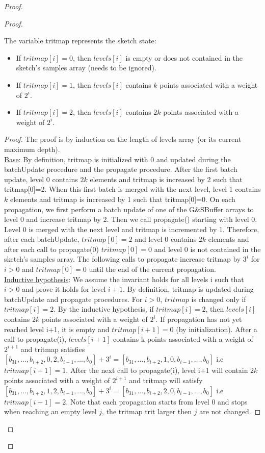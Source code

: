 \begin{proof}
\begin{proof}
\begin{invariant} \label{Inv: tritmap_sketch_state}
The variable tritmap represents the sketch state:
\begin{itemize}
    \item If \(tritmap[i] = 0\), then \(levels[i]\) is empty or does not contained in the sketch's samples array (needs to be ignored).
    \item If \(tritmap[i] = 1\), then \(levels[i]\) contains \(k\) points associated with a weight of \(2^i\).
    \item If \(tritmap[i] = 2\), then \(levels[i]\) contains \(2k\) points associated with a weight of \(2^i\).
\end{itemize}
\end{invariant}
\begin{proof}
The proof is by induction on the length of levels array (or its current maximum depth).\\
\underline{Base}: By definition, tritmap is initialized with 0 and updated during the batchUpdate procedure and the propagate procedure.
After the first batch update, level 0 contains $2k$ elements and tritmap is increased by 2 such that tritmap[0]=2. When this first batch is merged with the next level, level 1 contains $k$ elements and tritmap is increased by 1 such that tritmap[0]=0.
On each propagation, we first perform a batch update of one of the G\&SBuffer arrays to level 0 and increase tritmap by 2. Then we call propagate() starting with level 0. Level 0 is merged with the next level and tritmap is incremented by 1. Therefore, after each batchUpdate, \(tritmap[0] = 2\) and level 0 contains \(2k\) elements and after each call to propagate(0) \(tritmap[0] = 0\) and level 0 is not contained in the sketch's samples array. The following calls to propagate increase tritmap by $3^i$ for $i>0$ and \(tritmap[0] = 0\) until the end of the current propagation. \\
\underline{Inductive hypothesis}: We assume the invariant holds for all levels i such that \(i>0\) and prove it holds for level \(i+1\). By definition, tritmap is updated during batchUpdate and propagate procedures. For \(i>0\), \(tritmap\) is changed only if \(tritmap[i]=2\). By the inductive hypothesis, if \(tritmap[i] = 2\), then \(levels[i]\) contains \(2k\) points associated with a weight of \(2^i\). If propagation has not yet reached level i+1, it is empty and \(tritmap[i+1]=0\) (by initialization). After a call to propagate(i), \(levels[i+1]\) contains k points associated with a weight of \(2^{i+1}\) and tritmap satisfies \([b_{31},\dots,b_{i+2},0,2,b_{i-1},\dots,b_0] + 3^i = [b_{31},\dots,b_{i+2},1,0,b_{i-1},\dots,b_0]\) i.e \(tritmap[i+1]=1\). After the next call to propagate(i), level i+1 will contain \(2k\) points associated with a weight of \(2^{i+1}\) and tritmap will satisfy \([b_{31},\dots,b_{i+2},1,2,b_{i-1},\dots,b_0] + 3^i = [b_{31},\dots,b_{i+2},2,0,b_{i-1},\dots,b_0]\) i.e \(tritmap[i+1]=2\). Note that each propagation starts from level 0 and stops when reaching an empty level $j$, the tritmap trit larger then $j$ are not changed.
\end{proof}



\end{proof}
\end{proof}

